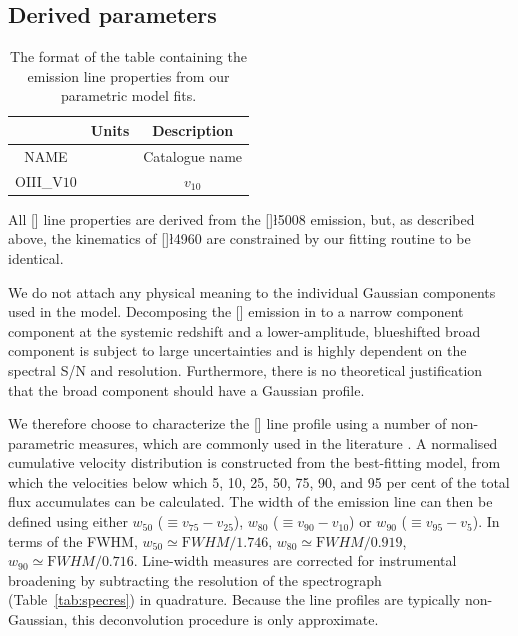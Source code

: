 \subsection{Derived parameters}

\begin{table}
  \centering
  \small
  \caption{The format of the table containing the emission line properties from our parametric model fits. }
  \label{tab:specmeasure}
  \centering
    \begin{tabular}{ccc} 
    \hline
    & Units & Description \\ 
    \hline
    NAME & & Catalogue name \\
    OIII\_V$10$ & & $v_{10}$ \\
    \hline
    \end{tabular}
\end{table}

All [] line properties are derived from the []\l5008 emission, but, as described above, the kinematics of []\l4960 are constrained by our fitting routine to be identical.

We do not attach any physical meaning to the individual Gaussian components used in the model. 
Decomposing the [] emission in to a narrow component component at the systemic redshift and a lower-amplitude, blueshifted broad component is subject to large uncertainties and is highly dependent on the spectral \ac{S/N} and resolution. 
Furthermore, there is no theoretical justification that the broad component should have a Gaussian profile.  

We therefore choose to characterize the [] line profile using a number of non-parametric measures, which are commonly used in the literature \citep[e.g.][]{zakamska14,zakamska16}. 
A normalised cumulative velocity distribution is constructed from the best-fitting model, from which the velocities below which 5, 10, 25, 50, 75, 90, and 95 per cent of the total flux accumulates can be calculated. 
The width of the emission line can then be defined using either $w_{50}$ ($\equiv v_{75} - v_{25}$), $w_{80}$ ($\equiv v_{90} - v_{10}$) or $w_{90}$ ($\equiv v_{95} - v_{5}$). 
In terms of the \ac{FWHM}, $w_{50} \simeq {\mathrm FWHM} / 1.746$, $w_{80} \simeq {\mathrm FWHM} / 0.919$, $w_{90} \simeq {\mathrm FWHM} / 0.716$.  
Line-width measures are corrected for instrumental broadening by subtracting the resolution of the spectrograph (Table~\ref{tab:specres}) in quadrature.
Because the line profiles are typically non-Gaussian, this deconvolution procedure is only approximate. 

